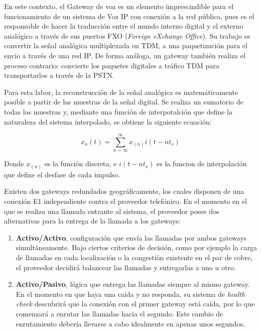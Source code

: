 \documentclass[a4paper, 12pt]{book}
\begin{document}
En este contexto, el Gateway de voz es un elemento imprescindible para el funcionamiento de un sistema de Voz IP con conexión a la red pública, pues es el responsable de hacer la traducción entre el mundo interno digital y el externo analógico a través de sus puertos FXO (\emph{Foreign eXchange Office}). Su trabajo es convertir la señal analógica multiplexada en TDM, a una paquetización para el envío a través de una red IP. De forma análoga, un gateway también realiza el proceso contrario: convierte los paquetes digitales a tráfico TDM para transportarlos a través de la PSTN.

Para esta labor, la reconstrucción de la señal analógica es matemáticamente posible a partir de las muestras de la señal digital. Se realiza un sumatorio de todas las muestras y, mediante una función de interpotalción que define la naturaleza del sistema interpolado, se obtiene la siguiente ecuación:

\[
x_{a}(t) = \sum_{n=\infty}^\infty x_{(n)}i(t-nt_{s})
\]

Donde $x_{(n)}$ es la función discreta, e $i(t-nt_{s})$ es la funcion de interpolación que define el desfase de cada impulso.

Existen dos gateways redundados geográficamente, los cuales disponen de una conexión E1 independiente contra el proveedor telefónico. En el momento en el que se realiza una llamada entrante al sistema, el proveedor posee dos alternativas para la entrega de la llamada a los gateways:

\begin{enumerate}
  \item \textbf{Activo/Activo}, configuración que envía las llamadas por ambos gateways simultáneamente. Bajo ciertos criterios de decisión, como por ejemplo la carga de llamadas en cada localización o la congestión existente en el par de cobre, el proveedor decidirá balancear las llamadas y entregarlas a uno u otro.
  \item \textbf{Activo/Pasivo}, lógica que entrega las llamadas siempre al mismo gateway. En el momento en que haya una caída y no responda, su sistema de \emph{health check} descubrirá que la conexión con el primer gateway está caída, por lo que comenzará a enrutar las llamadas hacia el segundo. Este cambio de enrutamiento debería llevarse a cabo idealmente en apenas unos segundos.
\end{enumerate}
\end{document}
